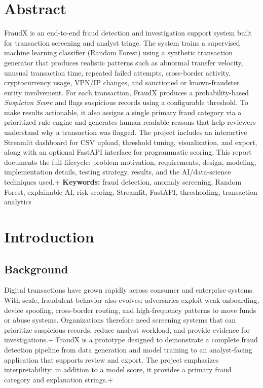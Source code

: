 \documentclass[12pt,a4paper]{report}
\begin{document}
\chapter*{Abstract}
FraudX is an end-to-end fraud detection and investigation support system built for transaction screening and analyst triage. The system trains a supervised machine learning classifier (Random Forest) using a synthetic transaction generator that produces realistic patterns such as abnormal transfer velocity, unusual transaction time, repeated failed attempts, cross-border activity, cryptocurrency usage, VPN/IP changes, and sanctioned or known-fraudster entity involvement. For each transaction, FraudX produces a probability-based \textit{Suspicion Score} and flags suspicious records using a configurable threshold. To make results actionable, it also assigns a single primary fraud category via a prioritized rule engine and generates human-readable reasons that help reviewers understand why a transaction was flagged. The project includes an interactive Streamlit dashboard for CSV upload, threshold tuning, visualization, and export, along with an optional FastAPI interface for programmatic scoring. This report documents the full lifecycle: problem motivation, requirements, design, modeling, implementation details, testing strategy, results, and the AI/data-science techniques used.\n+
\noindent\textbf{Keywords:} fraud detection, anomaly screening, Random Forest, explainable AI, risk scoring, Streamlit, FastAPI, thresholding, transaction analytics

\tableofcontents
\listoffigures
\listoftables

\chapter{Introduction}
\section{Background}
Digital transactions have grown rapidly across consumer and enterprise systems. With scale, fraudulent behavior also evolves: adversaries exploit weak onboarding, device spoofing, cross-border routing, and high-frequency patterns to move funds or abuse systems. Organizations therefore need screening systems that can prioritize suspicious records, reduce analyst workload, and provide evidence for investigations.\n+
FraudX is a prototype designed to demonstrate a complete fraud detection pipeline from data generation and model training to an analyst-facing application that supports review and export. The project emphasizes interpretability: in addition to a model score, it provides a primary fraud category and explanation strings.\n+
\end{document}
